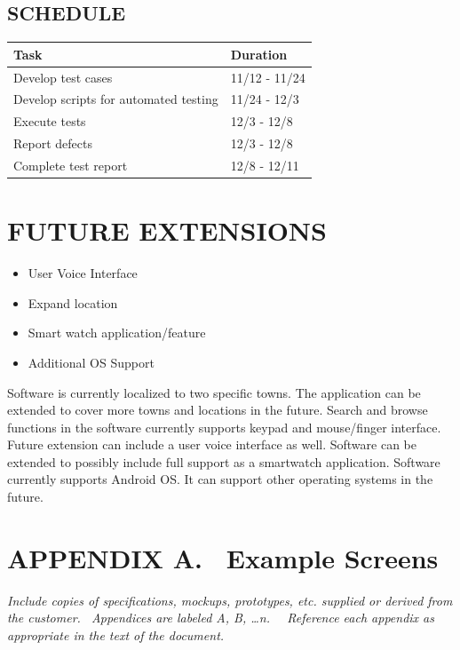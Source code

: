 \documentclass[twoside,letterpaper]{article}
\begin{document}
\subsection{SCHEDULE}
{\rmfamily\color{black}
\begin{center}
\begin{tabular}{ | M{5cm} | M{5cm}| } 
\hline
\textbf{Task} & \textbf{Duration}\\ 
\hline
Develop test cases & 11/12 - 11/24 \\ 
\hline
Develop scripts for automated testing & 11/24 - 12/3 \\ 
\hline
Execute tests & 12/3 - 12/8 \\ 
\hline
Report defects & 12/3 - 12/8 \\ 
\hline
Complete test report & 12/8 - 12/11 \\ 
\hline
\end{tabular}
\end{center}
}

\clearpage\section{FUTURE EXTENSIONS}
\begin{itemize}
\item{User Voice Interface}
\item{Expand location}
\item{Smart watch application/feature}
\item{Additional OS Support}
\end{itemize}
{\rmfamily\color{black}
Software is currently localized to two specific towns.  The application can be extended to cover more towns and locations in the future.
Search and browse functions in the software currently supports keypad and mouse/finger interface.  Future extension can include a user voice interface as well. 
Software can be extended to possibly include full support as a smartwatch application. 
Software currently supports Android OS.  It can support other operating systems in the future.}

\clearpage\section[APPENDIX A. \ Example Screens]{\rmfamily\bfseries\color{black}
APPENDIX A. \ Example Screens}

\bigskip

{\itshape\color{black}
Include copies of specifications, mockups, prototypes, etc. supplied or
derived from the customer. \ Appendices are labeled A, B, {\dots}n.
\ \ Reference each appendix as appropriate in the text of the document.
}
\end{document}
